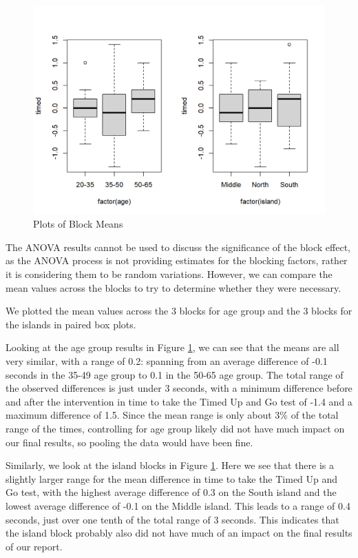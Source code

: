 \documentclass[11pt,a4paper,twoside]{tau-book}
\begin{document}
\begin{figure}[H]
        \centering
        \includegraphics[width=1\columnwidth]{Figures/block_means_plot.png}
        \caption{Plots of Block Means}
        \label{fig:block_means_plot}
\end{figure}

The ANOVA results cannot be used to discuss the significance of the block effect, as the ANOVA process is not providing estimates for the blocking factors, rather it is considering them to be random variations. However, we can compare the mean values across the blocks to try to determine whether they were necessary. 

We plotted the mean values across the 3 blocks for age group and the 3 blocks for the islands in paired box plots. 

Looking at the age group results in Figure \ref{fig:block_means_plot}, we can see that the means are all very similar, with a range of 0.2: spanning from an average difference of -0.1 seconds in the 35-49 age group to 0.1 in the 50-65 age group. The total range of the observed differences is just under 3 seconds, with a minimum difference before and after the intervention in time to take the Timed Up and Go test of -1.4 and a maximum difference of 1.5. Since the mean range is only about 3\% of the total range of the times, controlling for age group likely did not have much impact on our final results, so pooling the data would have been fine. 

Similarly, we look at the island blocks in Figure \ref{fig:block_means_plot}. Here we see that there is a slightly larger range for the mean difference in time to take the Timed Up and Go test, with the highest average difference of 0.3 on the South island and the lowest average difference of -0.1 on the Middle island. This leads to a range of 0.4 seconds, just over one tenth of the total range of 3 seconds. This indicates that the island block probably also did not have much of an impact on the final results of our report. 
\end{document}
